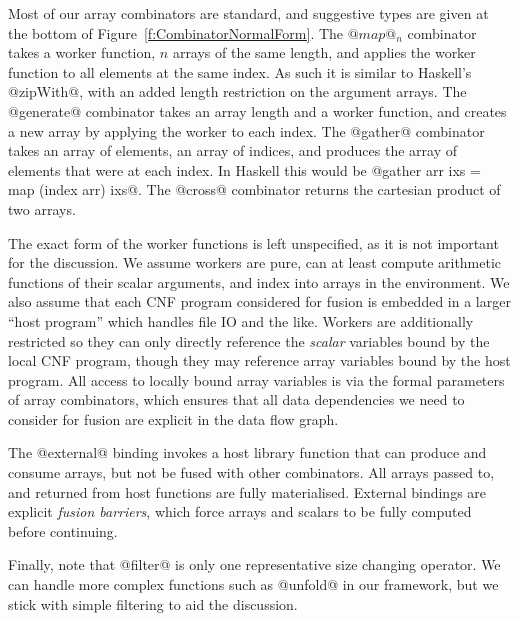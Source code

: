 Most of our array combinators are standard, and suggestive types are given at the bottom of Figure~\ref{f:CombinatorNormalForm}. The $@map@_n$ combinator takes a worker function, $n$ arrays of the same length, and applies the worker function to all elements at the same index. As such it is similar to Haskell's @zipWith@, with an added length restriction on the argument arrays. The @generate@ combinator takes an array length and a worker function, and creates a new array by applying the worker to each index. The @gather@ combinator takes an array of elements, an array of indices, and produces the array of elements that were at each index. In Haskell this would be @gather arr ixs = map (index arr) ixs@. The @cross@ combinator returns the cartesian product of two arrays. 

The exact form of the worker functions is left unspecified, as it is not important for the discussion. We assume workers are pure, can at least compute arithmetic functions of their scalar arguments, and index into arrays in the environment. We also assume that each CNF program considered for fusion is embedded in a larger ``host program'' which handles file IO and the like. Workers are additionally restricted so they can only directly reference the \emph{scalar} variables bound by the local CNF program, though they may reference array variables bound by the host program. All access to locally bound array variables is via the formal parameters of array combinators, which ensures that all data dependencies we need to consider for fusion are explicit in the data flow graph.

The @external@ binding invokes a host library function that can produce and consume arrays, but not be fused with other combinators. All arrays passed to, and returned from host functions are fully materialised. External bindings are explicit \emph{fusion barriers}, which force arrays and scalars to be fully computed before continuing. 

Finally, note that @filter@ is only one representative size changing operator. We can handle more complex functions such as @unfold@ in our framework, but we stick with simple filtering to aid the discussion.




